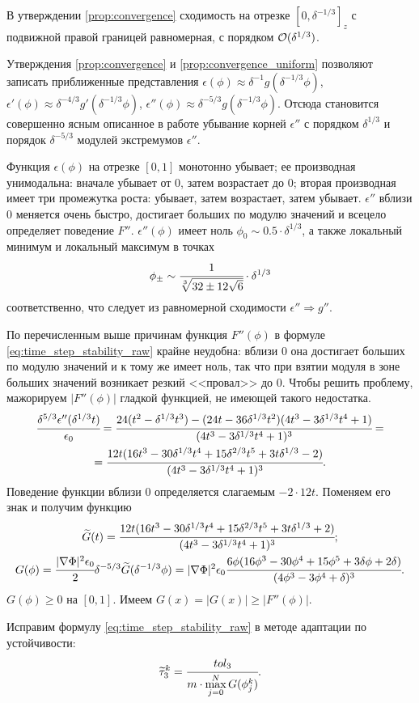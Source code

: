 \begin{proposition}
	\label{prop:convergence_uniform}
	В утверждении \ref{prop:convergence} сходимость на отрезке $[0, \delta^{-1/3}]_z$ с подвижной правой границей равномерная, с порядком ${\mathcal{O}}(\delta^{1/3})$. 
\end{proposition}

Утверждения \ref{prop:convergence} и \ref{prop:convergence_uniform} позволяют записать приближенные представления $\epsilon(\phi) \approx \delta^{-1} g(\delta^{-1/3} \phi)$, $\epsilon'(\phi) \approx \delta^{-4/3} g'(\delta^{-1/3} \phi)$, $\epsilon''(\phi) \approx \delta^{-5/3} g(\delta^{-1/3} \phi)$. Отсюда становится совершенно ясным описанное в работе \cite{ponomarev_stability} убывание корней $\epsilon''$ с порядком $\delta^{1/3}$ и порядок $\delta^{-5/3}$ модулей экстремумов $\epsilon''$.

Функция $\epsilon(\phi)$ на отрезке $[0, 1]$ монотонно убывает; ее производная унимодальна: вначале убывает от $0$, затем возрастает до $0$; вторая производная имеет три промежутка роста: убывает, затем возрастает, затем убывает. $\epsilon''$ вблизи $0$ меняется очень быстро, достигает больших по модулю значений и всецело определяет поведение $F''$. $\epsilon''(\phi)$ имеет ноль $\phi_0 \sim 0.5 \cdot \delta^{1/3}$, а также локальный минимум и локальный максимум в точках
\[
	\phi_\pm \sim \cfrac{1}{\sqrt[3]{32 \pm 12 \sqrt{6}}} \cdot \delta^{1/3}
\]
соответственно, что следует из равномерной сходимости $\epsilon'' \Rightarrow g''$.

По перечисленным выше причинам функция $F''(\phi)$ в формуле \eqref{eq:time_step_stability_raw} крайне неудобна: вблизи $0$ она достигает больших по модулю значений и к тому же имеет ноль, так что при взятии модуля в зоне больших значений возникает резкий <<провал>> до $0$. Чтобы решить проблему, мажорируем $|F''(\phi)|$ гладкой функцией, не имеющей такого недостатка.
\begin{multline*}
	\cfrac{\delta^{5/3} \epsilon''(\delta^{1/3} t)}{\epsilon_0} = \cfrac{24 (t^2 - \delta^{1/3} t^3) - (24 t - 36 \delta^{1/3} t^2)(4 t^3 - 3 \delta^{1/3} t^4 + 1)}{(4 t^3 - 3 \delta^{1/3} t^4 + 1)^3} = \\
	= \cfrac{12t (16 t^3 - 30 \delta^{1/3} t^4 + 15 \delta^{2/3} t^5 + 3t \delta^{1/3} - 2)}{(4 t^3 - 3 \delta^{1/3} t^4 + 1)^3}.
\end{multline*}
Поведение функции вблизи $0$ определяется слагаемым $-2 \cdot 12t$. Поменяем его знак и получим функцию
\begin{gather*}
	\widetilde{G}(t) = \cfrac{12t (16 t^3 - 30 \delta^{1/3} t^4 + 15 \delta^{2/3} t^5 + 3t \delta^{1/3} + 2)}{(4 t^3 - 3 \delta^{1/3} t^4 + 1)^3}; \\
	G(\phi) = \cfrac{|\nabla \Phi|^2 \epsilon_0}{2} \delta^{-5/3} \widetilde{G}(\delta^{-1/3} \phi) = |\nabla \Phi|^2 \epsilon_0 \cfrac{6 \phi (16 \phi^3 - 30 \phi^4 + 15 \phi^5 + 3 \delta \phi + 2 \delta)}{(4 \phi^3 - 3 \phi^4 + \delta)^3}.
\end{gather*}
$G(\phi) \geqslant 0$ на $[0, 1]$. Имеем $G(x) = |G(x)| \geqslant |F''(\phi)|$.

Исправим формулу \eqref{eq:time_step_stability_raw} в методе адаптации по устойчивости:
\begin{equation}
	\widetilde{\tau}_3^k = \cfrac{tol_3}{m \cdot \max\limits_{j = 0}^N G(\phi_j^k)}.
	\label{eq:time_step_stability}
\end{equation}